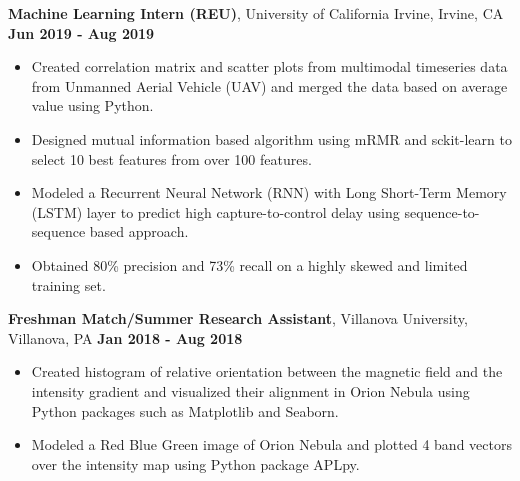 \documentclass[letterpaper,11pt]{article}
\begin{document}
      {\textbf{Machine Learning Intern (REU)}, University of California Irvine, Irvine, CA} 
      \null\hfill \textbf{Jun 2019 - Aug 2019}
      \begin{itemize}
      \itemsep0em 
          \item
            {Created correlation matrix and scatter plots from multimodal timeseries data from Unmanned Aerial Vehicle (UAV) and merged the data based on average value using Python.}
        \item
            {Designed mutual information based algorithm using mRMR and sckit-learn to select 10 best features from over 100 features.}
        \item
            {Modeled a Recurrent Neural Network (RNN) with Long Short-Term Memory (LSTM) layer to predict high capture-to-control delay using sequence-to-sequence based approach.}
        \item
            {Obtained 80\% precision and 73\% recall on a highly skewed and limited training set.}
      \end{itemize}
      
      {\textbf{Freshman Match/Summer Research Assistant}, Villanova University, Villanova, PA}
      \null\hfill \textbf{Jan 2018 - Aug 2018}
      \begin{itemize}
      \itemsep0em 
          \item
            {Created histogram of relative orientation between the magnetic field and the intensity gradient and visualized their alignment in Orion Nebula using Python packages such as Matplotlib and Seaborn.}
        \item
            {Modeled a Red Blue Green image of Orion Nebula and plotted 4 band vectors over the intensity map using Python package APLpy.}
      \end{itemize}


\end{document}
